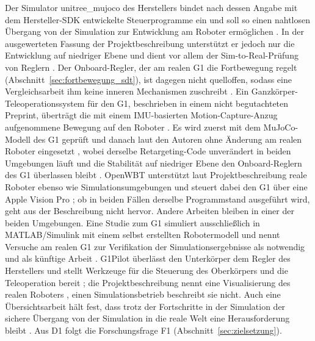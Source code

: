 Der Simulator unitree\_mujoco des Herstellers bindet nach dessen Angabe mit dem Hersteller-SDK entwickelte Steuerprogramme ein und soll so einen nahtlosen Übergang von der Simulation zur Entwicklung am Roboter ermöglichen \cite{UnitreeMujoco}.
In der ausgewerteten Fassung der Projektbeschreibung unterstützt er jedoch nur die Entwicklung auf niedriger Ebene und dient vor allem der Sim-to-Real-Prüfung von Reglern \cite{UnitreeMujoco}.
Der Onboard-Regler, der am realen G1 die Fortbewegung regelt (Abschnitt~\ref{sec:fortbewegung_sdt}), ist dagegen nicht quelloffen, sodass eine Vergleichsarbeit ihm keine inneren Mechanismen zuschreibt \cite{Hu2026}.
Ein Ganzkörper-Teleoperationssystem für den G1, beschrieben in einem nicht begutachteten Preprint, überträgt die mit einem IMU-basierten Motion-Capture-Anzug aufgenommene Bewegung auf den Roboter \cite{Durrani2026}.
Es wird zuerst mit dem MuJoCo-Modell des G1 geprüft und danach laut den Autoren ohne Änderung am realen Roboter eingesetzt \cite{Durrani2026}, wobei derselbe Retargeting-Code unverändert in beiden Umgebungen läuft \cite{Durrani2026} und die Stabilität auf niedriger Ebene den Onboard-Reglern des G1 überlassen bleibt \cite{Durrani2026}.
OpenWBT unterstützt laut Projektbeschreibung reale Roboter ebenso wie Simulationsumgebungen und steuert dabei den G1 über eine Apple Vision Pro \cite{GalbotOpenWBT}; ob in beiden Fällen derselbe Programmstand ausgeführt wird, geht aus der Beschreibung nicht hervor.
Andere Arbeiten bleiben in einer der beiden Umgebungen.
Eine Studie zum G1 simuliert ausschließlich in MATLAB/Simulink mit einem selbst erstellten Robotermodell \cite{Yu2026} und nennt Versuche am realen G1 zur Verifikation der Simulationsergebnisse als notwendig \cite{Yu2026} und als künftige Arbeit \cite{Yu2026}.
G1Pilot überlässt den Unterkörper dem Regler des Herstellers und stellt Werkzeuge für die Steuerung des Oberkörpers und die Teleoperation bereit \cite{HucebotG1Pilot}; die Projektbeschreibung nennt eine Visualisierung des realen Roboters \cite{HucebotG1Pilot}, einen Simulationsbetrieb beschreibt sie nicht.
Auch eine Übersichtsarbeit hält fest, dass trotz der Fortschritte in der Simulation der sichere Übergang von der Simulation in die reale Welt eine Herausforderung bleibt \cite{Tong2024}.
Aus D1 folgt die Forschungsfrage F1 (Abschnitt~\ref{sec:zielsetzung}).
